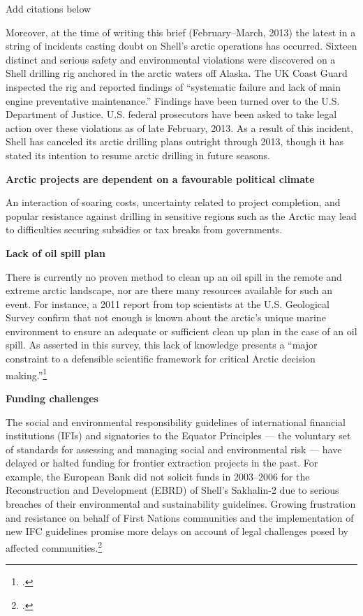 \begin{vcom}
	Add citations below
\end{vcom}

Moreover, at the time of writing this brief (February--March, 2013) the latest in a string of incidents casting doubt on Shell's arctic operations has occurred. 
Sixteen distinct and serious safety and environmental violations were discovered on a Shell drilling rig anchored in the arctic waters off Alaska. 
The UK Coast Guard inspected the rig and reported findings of ``systematic failure and lack of main engine preventative maintenance.'' 
Findings have been turned over to the U.S. Department of Justice. U.S. federal prosecutors have been asked to take legal action over these violations as of late February, 2013. 
As a result of this incident, Shell has canceled its arctic drilling plans outright through 2013, though it has stated its intention to resume arctic drilling in future seasons.



\textbf{Arctic projects are dependent on a favourable political climate}



An interaction of soaring costs, uncertainty related to project completion, and popular resistance against drilling in sensitive regions such as the Arctic may lead to difficulties securing subsidies or tax breaks from governments.



\textbf{Lack of oil spill plan}



There is currently no proven method to clean up an oil spill in the remote and extreme arctic landscape, nor are there many resources available for such an event. 
For instance, a 2011 report from top scientists at the U.S. Geological Survey confirm that not enough is known about the arctic's unique marine environment to ensure an adequate or sufficient clean up plan in the case of an oil spill. 
As asserted in this survey, this lack of knowledge presents a ``major constraint to a defensible scientific framework for critical Arctic decision making.''\footcite[][]{Holland-BartelsPierce_2011}



\textbf{Funding challenges}



The social and environmental responsibility guidelines of international financial institutions (IFIs) and signatories to the Equator Principles --- the voluntary set of standards for assessing and managing social and environmental risk --- have delayed or halted funding for frontier extraction projects in the past. 
For example, the European Bank did not solicit funds in 2003--2006 for the Reconstruction and Development (EBRD) of Shell's Sakhalin-2 due to serious breaches of their environmental and sustainability guidelines. 
Growing frustration and resistance on behalf of First Nations communities and the implementation of new IFC guidelines promise more delays on account of legal challenges posed by affected communities.\footcite[][]{Mathiason_2005}



